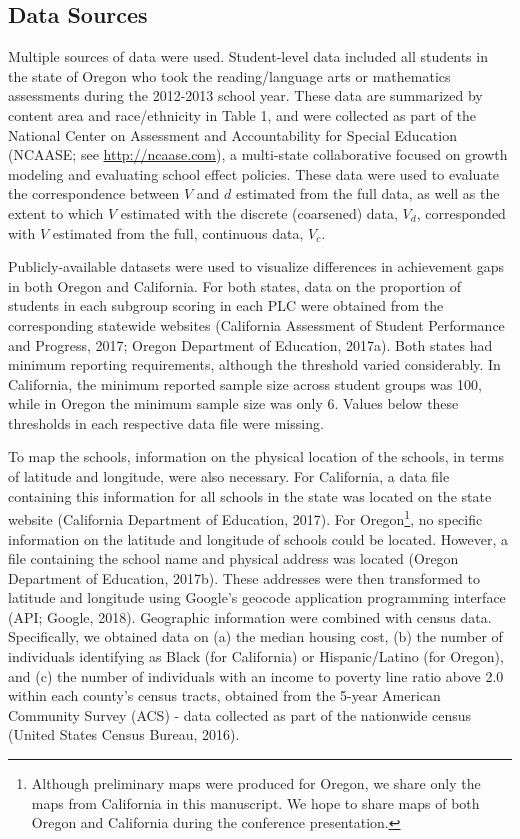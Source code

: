 \documentclass[man, fleqn, noextraspace]{apa6}
\theoremstyle{definition}
\theoremstyle{definition}
\theoremstyle{definition}
\theoremstyle{remark}
\begin{document}
\hypertarget{data-sources}{%
\subsection{Data Sources}\label{data-sources}}

Multiple sources of data were used. Student-level data included all
students in the state of Oregon who took the reading/language arts or
mathematics assessments during the 2012-2013 school year. These data are
summarized by content area and race/ethnicity in Table 1, and were
collected as part of the National Center on Assessment and
Accountability for Special Education (NCAASE; see
\url{http://ncaase.com}), a multi-state collaborative focused on growth
modeling and evaluating school effect policies. These data were used to
evaluate the correspondence between \(V\) and \(d\) estimated from the
full data, as well as the extent to which \(V\) estimated with the
discrete (coarsened) data, \(V_{d}\), corresponded with \(V\) estimated
from the full, continuous data, \(V_{c}\).

Publicly-available datasets were used to visualize differences in
achievement gaps in both Oregon and California. For both states, data on
the proportion of students in each subgroup scoring in each PLC were
obtained from the corresponding statewide websites (California
Assessment of Student Performance and Progress, 2017; Oregon Department
of Education, 2017a). Both states had minimum reporting requirements,
although the threshold varied considerably. In California, the minimum
reported sample size across student groups was 100, while in Oregon the
minimum sample size was only 6. Values below these thresholds in each
respective data file were missing.

To map the schools, information on the physical location of the schools,
in terms of latitude and longitude, were also necessary. For California,
a data file containing this information for all schools in the state was
located on the state website (California Department of Education, 2017).
For Oregon\footnote{Although preliminary maps were produced for Oregon,
  we share only the maps from California in this manuscript. We hope to
  share maps of both Oregon and California during the conference
  presentation.}, no specific information on the latitude and longitude
of schools could be located. However, a file containing the school name
and physical address was located (Oregon Department of Education,
2017b). These addresses were then transformed to latitude and longitude
using Google's geocode application programming interface (API; Google,
2018). Geographic information were combined with census data.
Specifically, we obtained data on (a) the median housing cost, (b) the
number of individuals identifying as Black (for California) or
Hispanic/Latino (for Oregon), and (c) the number of individuals with an
income to poverty line ratio above 2.0 within each county's census
tracts, obtained from the 5-year American Community Survey (ACS) - data
collected as part of the nationwide census (United States Census Bureau,
2016).
\end{document}
